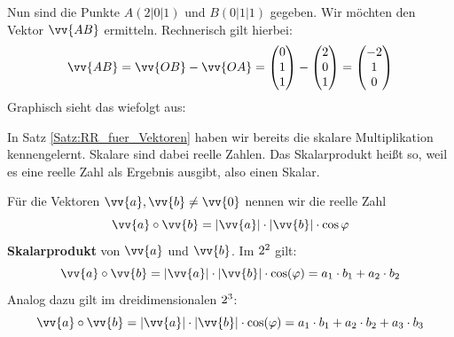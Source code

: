 \documentclass[ngerman, 12pt]{nssheetxea}
\begin{document}
\begin{example}
Nun sind die Punkte $A(2|0|1)$ und $B(0|1|1)$ gegeben. Wir möchten den Vektor $\vv{AB}$ ermitteln. Rechnerisch gilt hierbei:
\[  \vv{AB} = \vv{OB} - \vv{OA} = \colvec[0]{1}{1} - \colvec[2]{0}{1} = \colvec[-2]{1}{0}  \]
Graphisch sieht das wiefolgt aus:
\begin{center}
\end{center}
\end{example}

In Satz \ref{Satz:RR_fuer_Vektoren} haben wir bereits die skalare Multiplikation kennengelernt. Skalare sind dabei reelle Zahlen. Das Skalarprodukt heißt so, weil es eine reelle Zahl als Ergebnis ausgibt, also einen Skalar.

\begin{definition}
Für die Vektoren $\vv{a},\vv{b}\neq \vv{0}$ nennen wir die reelle Zahl
\[ \vv{a} \circ \vv{b} = |\vv{a}|\cdot |\vv{b}| \cdot \cos \varphi \]
\textbf{Skalarprodukt} von $\vv{a}$ und $\vv{b}$. Im $2^2$ gilt:
\[ \vv{a} \circ \vv{b}=|\vv{a}| \cdot |\vv{b}| \cdot \cos (\varphi) = a_1\cdot b_1 + a_2 \cdot b_2 \]
Analog dazu gilt im dreidimensionalen $2^3$:
\[ \vv{a} \circ \vv{b}=|\vv{a}| \cdot |\vv{b}| \cdot \cos (\varphi) = a_1\cdot b_1 + a_2 \cdot b_2 + a_3 \cdot b_3 \]
\end{definition}
\end{document}
